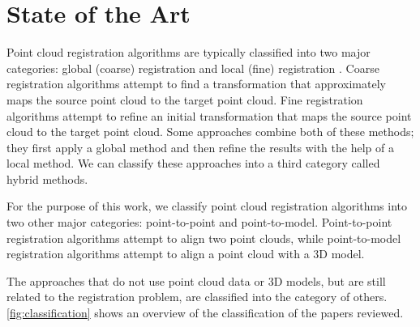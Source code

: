 

    \chapter{State of the Art}
    \label{chap:State of the Art}
    Point cloud registration algorithms are typically classified into two major categories: global (coarse) registration and local (fine) registration \cite{Quan_2020_com,Kim_2011_fully}.
    Coarse registration algorithms attempt to find a transformation that approximately maps the source point cloud to the target point cloud. 
    Fine registration algorithms attempt to refine an initial transformation that maps the source point cloud to the target point cloud.
    Some approaches combine both of these methods; they first apply a global method and then refine the results with the help of a local method. 
    We can classify these approaches into a third category called hybrid methods. 
    
    For the purpose of this work, we classify point cloud registration algorithms into two other major categories:
    point-to-point and point-to-model.
    Point-to-point registration algorithms attempt to align two point clouds, while point-to-model registration algorithms attempt to align a point cloud with a 3D model.

    The approaches that do not use point cloud data or 3D models, but are still related to the registration problem, are classified into the category of others.
    \autoref{fig:classification} shows an overview of the classification of the papers reviewed.
    
